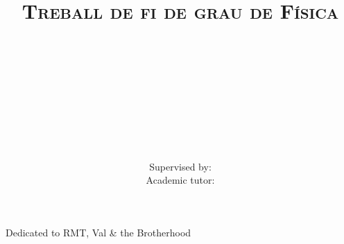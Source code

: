 \documentclass[paper=a4, fontsize=12pt, twoside=semi, abstracton, listof=totoc, toc=left]{scrartcl}
\title{
	\normalfont
	\small \scshape{\myuni} \\ [25pt]
	\large \scshape{Treball de fi de grau de Física} \\
	\horrule{0.5pt} \\ [0.4cm]
	\huge \mytitle \\
	\Large \scshape{\mysubtitle} \\
	\horrule{2pt} \\ [0.5cm]
}
\author{\myauthor \\ \footnotesize Supervised by: \mysupervisor \\ \footnotesize Academic tutor: \mytutor}
\date{\mydate}
\newenvironment{mydedication}
	{\clearpage           %
	\thispagestyle{empty}%
	\vspace*{\stretch{1}}%
	\itshape             %
	\raggedleft          %
	}
	{\par %
	\vspace{\stretch{3}} %
	\clearpage           %
	}
\begin{document}

\clearpage\maketitle
\thispagestyle{empty}
\addtocounter{page}{-1}

\begin{mydedication}
	Dedicated to RMT, Val \& the Brotherhood
\end{mydedication}



\tableofcontents





\begin{appendices}

\end{appendices}


\printbibliography[heading=bibintoc]
\end{document}
